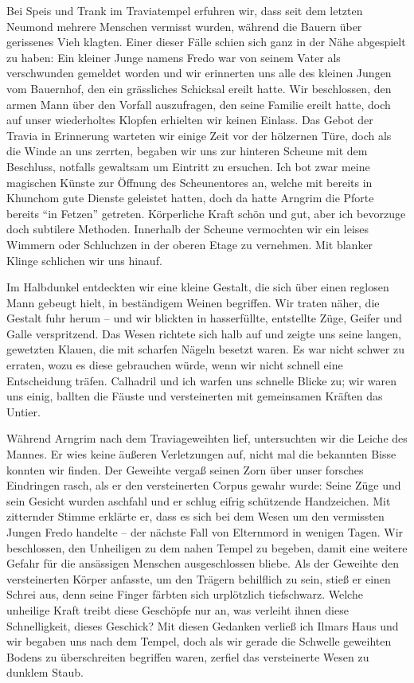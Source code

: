 Bei Speis und Trank im Traviatempel erfuhren wir, dass seit dem letzten Neumond mehrere Menschen vermisst wurden, während die Bauern über gerissenes Vieh klagten. Einer dieser Fälle schien sich ganz in der Nähe abgespielt zu haben: Ein kleiner Junge namens Fredo war von seinem Vater als verschwunden gemeldet worden und wir erinnerten uns alle des kleinen Jungen vom Bauernhof, den ein grässliches Schicksal ereilt hatte. Wir beschlossen, den armen Mann über den Vorfall auszufragen, den seine Familie ereilt hatte, doch auf unser wiederholtes Klopfen erhielten wir keinen Einlass. Das Gebot der Travia in Erinnerung warteten wir einige Zeit vor der hölzernen Türe, doch als die Winde an uns zerrten, begaben wir uns zur hinteren Scheune mit dem Beschluss, notfalls gewaltsam um Eintritt zu ersuchen. Ich bot zwar meine magischen Künste zur Öffnung des Scheunentores an, welche mit bereits in Khunchom gute Dienste geleistet hatten, doch da hatte Arngrim die Pforte bereits ``in Fetzen'' getreten. Körperliche Kraft schön und gut, aber ich bevorzuge doch subtilere Methoden. Innerhalb der Scheune vermochten wir ein leises Wimmern oder Schluchzen in der oberen Etage zu vernehmen. Mit blanker Klinge schlichen wir uns hinauf. 


Im Halbdunkel entdeckten wir eine kleine Gestalt, die sich über einen reglosen Mann gebeugt hielt, in beständigem Weinen begriffen. Wir traten näher, die Gestalt fuhr herum -- und wir blickten in hasserfüllte, entstellte Züge, Geifer und Galle verspritzend. Das Wesen richtete sich halb auf und zeigte uns seine langen, gewetzten Klauen, die mit scharfen Nägeln besetzt waren. Es war nicht schwer zu erraten, wozu es diese gebrauchen würde, wenn wir nicht schnell eine Entscheidung träfen. Calhadril und ich warfen uns schnelle Blicke zu; wir waren uns einig, ballten die Fäuste und versteinerten mit gemeinsamen Kräften das Untier. 


Während Arngrim nach dem Traviageweihten lief, untersuchten wir die Leiche des Mannes. Er wies keine äußeren Verletzungen auf, nicht mal die bekannten Bisse konnten wir finden. Der Geweihte vergaß seinen Zorn über unser forsches Eindringen rasch, als er den versteinerten Corpus gewahr wurde: Seine Züge und sein Gesicht wurden aschfahl und er schlug eifrig schützende Handzeichen. Mit zitternder Stimme erklärte er, dass es sich bei dem Wesen um den vermissten Jungen Fredo handelte -- der nächste Fall von Elternmord in wenigen Tagen. Wir beschlossen, den Unheiligen zu dem nahen Tempel zu begeben, damit eine weitere Gefahr für die ansässigen Menschen ausgeschlossen bliebe. Als der Geweihte den versteinerten Körper anfasste, um den Trägern behilflich zu sein, stieß er einen Schrei aus, denn seine Finger färbten sich urplötzlich tiefschwarz. Welche unheilige Kraft treibt diese Geschöpfe nur an, was verleiht ihnen diese Schnelligkeit, dieses Geschick? Mit diesen Gedanken verließ ich Ilmars Haus und wir begaben uns nach dem Tempel, doch als wir gerade die Schwelle geweihten Bodens zu überschreiten begriffen waren, zerfiel das versteinerte Wesen zu dunklem Staub. 


